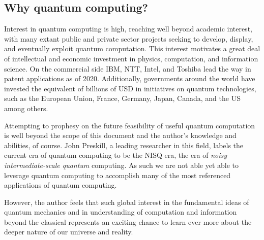 \subsection{Why quantum computing?}

Interest in quantum computing is high, reaching well beyond academic interest,
with many extant public and private sector projects seeking to develop, display,
and eventually exploit quantum computation. This interest motivates a great deal
of intellectual and economic investment in physics, computation, and information
science. On the commercial side IBM, NTT, Intel, and Toshiba lead the way in
patent applications as of 2020\cite{CommercialLandscape}. Additionally,
governments around the world have invested the equivalent of billions of USD in
initiatives on quantum technologies, such as the European Union, France,
Germany, Japan, Canada, and the US among others\cite{DownToBusiness}.

Attempting to prophesy on the future feasibility of useful quantum computation
is well beyond the scope of this document and the author's knowledge and
abilities, of course. John Preskill, a leading researcher in this field, labels
the current era of quantum computing to be the NISQ era, the era of \emph{noisy
intermediate-scale quantum} computing\cite{PreskillNISQ}. As such we are not
able yet able to leverage quantum computing to accomplish many of the most
referenced applications of quantum computing.

However, the author feels that such global interest in the fundamental ideas of
quantum mechanics and in understanding of computation and information beyond the
classical represents an exciting chance to learn ever more about the deeper
nature of our universe and reality. 

